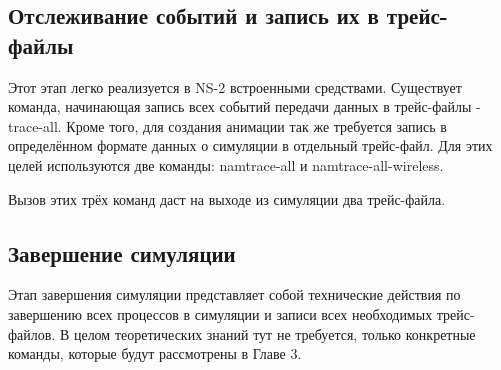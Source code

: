 \subsection*{Отслеживание событий и запись их в трейс-файлы}

Этот этап легко реализуется в NS-2 встроенными средствами. Существует команда, начинающая запись всех событий передачи данных в трейс-файлы - trace-all.
Кроме того, для создания анимации так же требуется запись в определённом формате данных о симуляции в отдельный трейс-файл. Для этих целей используются две команды: namtrace-all и namtrace-all-wireless.

Вызов этих трёх команд даст на выходе из симуляции два трейс-файла.

\subsection*{Завершение симуляции}

Этап завершения симуляции представляет собой технические действия по завершению всех процессов в симуляции и записи всех необходимых трейс-файлов. В целом теоретических знаний тут не требуется, только конкретные команды, которые будут рассмотрены в Главе 3.